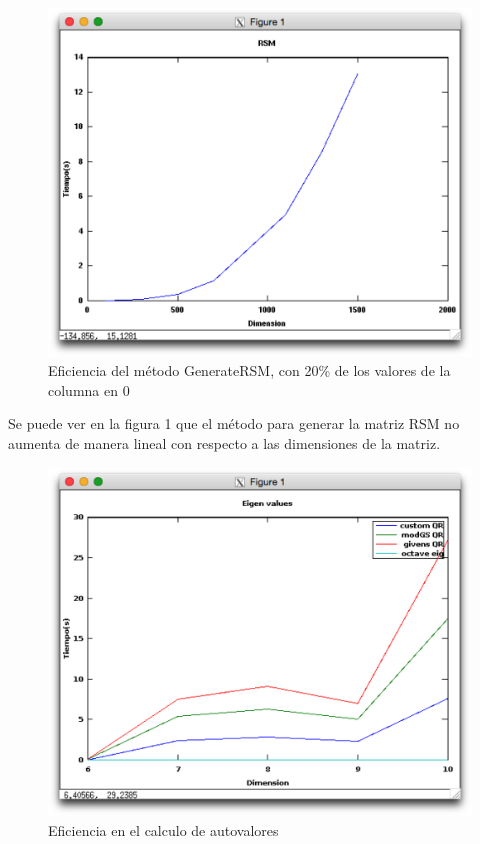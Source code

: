 \documentclass[a4paper,10pt,spanish]{article}
\begin{document}
\begin{figure}[!htb]
    \centering
    \includegraphics[width=120mm]{GenerateRSM.png} 
    \caption{Eficiencia del método GenerateRSM, con 20\% de los valores de la columna en 0}
\end{figure}

Se puede ver en la figura 1 que el método para generar la matriz RSM no aumenta de manera lineal con respecto a las dimensiones de la matriz.

\begin{figure}[!htb]
    \centering
    \includegraphics[width=120mm]{eig_comp.png}  
    \caption{Eficiencia en el calculo de autovalores}
\end{figure}
\end{document}

